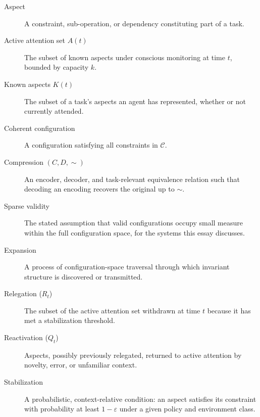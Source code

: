 \documentclass[12pt, a4paper]{article}
\theoremstyle{plain}
\theoremstyle{definition}
\theoremstyle{remark}
\begin{document}
\begin{description}
\item[Aspect] A constraint, sub-operation, or dependency constituting part of a task.
\item[Active attention set $A(t)$] The subset of known aspects under conscious monitoring at time $t$, bounded by capacity $k$.
\item[Known aspects $K(t)$] The subset of a task's aspects an agent has represented, whether or not currently attended.
\item[Coherent configuration] A configuration satisfying all constraints in $\mathcal{C}$.
\item[Compression $(C, D, \sim)$] An encoder, decoder, and task-relevant equivalence relation such that decoding an encoding recovers the original up to $\sim$.
\item[Sparse validity] The stated assumption that valid configurations occupy small measure within the full configuration space, for the systems this essay discusses.
\item[Expansion] A process of configuration-space traversal through which invariant structure is discovered or transmitted.
\item[Relegation ($R_t$)] The subset of the active attention set withdrawn at time $t$ because it has met a stabilization threshold.
\item[Reactivation ($Q_t$)] Aspects, possibly previously relegated, returned to active attention by novelty, error, or unfamiliar context.
\item[Stabilization] A probabilistic, context-relative condition: an aspect satisfies its constraint with probability at least $1-\varepsilon$ under a given policy and environment class.
\end{description}
\end{document}
